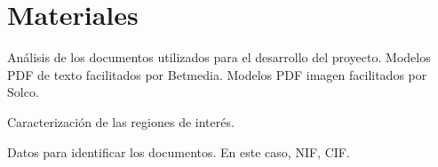 
\chapter{Materiales}
\label{chap:materiales}

Análisis de los documentos utilizados para el desarrollo del proyecto. Modelos PDF de texto facilitados por Betmedia. Modelos PDF imagen facilitados por Solco.

Caracterización de las regiones de interés.

Datos para identificar los documentos. En este caso, NIF, CIF.
